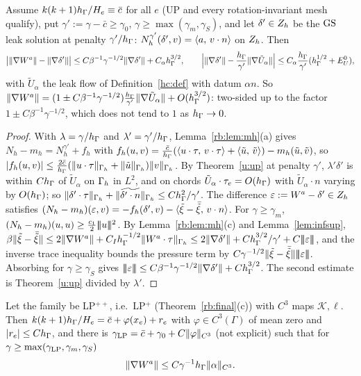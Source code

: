 \begin{theorem}\label{rb:Seq}
Assume $k(k+1)h_\Gamma/H_e\equiv\bar c$ for all $e$ (\textsf{UP} and every rotation-invariant mesh qualify), put $\gamma':=\gamma-\bar c\ge\gamma_0$, $\gamma\ge\max(\gamma_m,\gamma_S)$, and let $\delta'\in Z_h$ be the $\mathrm{GS}$ leak solution at penalty $\gamma'/h_\Gamma$: $N_h^{\gamma'}(\delta',v)=\langle a,\, v\cdot n\rangle$ on $Z_h$. Then
\[
\bigl|\lVert \nabla W^a\rVert-\lVert \nabla\delta'\rVert\bigr|\le C\beta^{-1}\gamma^{-1/2}\lVert \nabla\delta'\rVert+C_\alpha h_\Gamma^{3/2},\qquad
\Bigl|\lVert \nabla\delta'\rVert-\frac{h_\Gamma}{\gamma'}\lVert \nabla\tilde U_\alpha\rVert\Bigr|\le C_\alpha\frac{h_\Gamma}{\gamma'}(h_\Gamma^{1/2}+E^0_U),
\]
with $\tilde U_\alpha$ the leak flow of Definition~\ref{hc:def} with datum $\alpha n$. So $\lVert \nabla W^a\rVert=(1\pm C\beta^{-1}\gamma^{-1/2})\frac{h_\Gamma}{\gamma'}\lVert \nabla\tilde U_\alpha\rVert+O(h_\Gamma^{3/2})$: two-sided up to the factor $1\pm C\beta^{-1}\gamma^{-1/2}$, which does not tend to $1$ as $h_\Gamma\to0$.
\end{theorem}

\begin{proof}
With $\lambda=\gamma/h_\Gamma$ and $\lambda'=\gamma'/h_\Gamma$, Lemma~\ref{rb:lem:mh}(a) gives $N_h-m_h=N_h^{\gamma'}+f_h$ with $f_h(u,v)=\frac{\bar c}{h_\Gamma}(\langle u\cdot\tau,\, v\cdot\tau\rangle+\langle \tilde u,\, \tilde v\rangle)-m_h(\tilde u,\tilde v)$, so $|f_h(u,v)|\le\frac{2\bar c}{h_\Gamma}(\lVert u\cdot\tau\rVert_{\Gamma_h}+\lVert \tilde u\rVert_{\Gamma_h})\lVert v\rVert_{\Gamma_h}$. By Theorem~\ref{u:up} at penalty $\gamma'$, $\lambda'\delta'$ is within $Ch_\Gamma$ of $\tilde U_\alpha$ on $\Gamma_h$ in $L^2$, and on chords $\tilde U_\alpha\cdot\tau_e=O(h_\Gamma)$ with $\tilde U_\alpha\cdot n$ varying by $O(h_\Gamma)$; so $\lVert \delta'\cdot\tau\rVert_{\Gamma_h}+\lVert \widetilde{\delta'\cdot n}\rVert_{\Gamma_h}\le Ch_\Gamma^2/\gamma'$. The difference $\varepsilon:=W^a-\delta'\in Z_h$ satisfies $(N_h-m_h)(\varepsilon,v)=-f_h(\delta',v)-\langle \tilde\xi-\bar{\tilde\xi},\, v\cdot n\rangle$. For $\gamma\ge\gamma_m$, $(N_h-m_h)(u,u)\ge\frac{c_1}2|\!|\!|u|\!|\!|^2$. By Lemma~\ref{rb:lem:mh}(c) and Lemma~\ref{lem:infsup}, $\beta\lVert \tilde\xi-\bar{\tilde\xi}\rVert\le2\lVert \nabla W^a\rVert+C_Ih_\Gamma^{-1/2}\lVert W^a\cdot\tau\rVert_{\Gamma_h}\le2\lVert \nabla\delta'\rVert+Ch_\Gamma^{3/2}/\gamma'+C|\!|\!|\varepsilon|\!|\!|$, and the inverse trace inequality bounds the pressure term by $C\gamma^{-1/2}\lVert \tilde\xi-\bar{\tilde\xi}\rVert|\!|\!|\varepsilon|\!|\!|$. Absorbing for $\gamma\ge\gamma_S$ gives $|\!|\!|\varepsilon|\!|\!|\le C\beta^{-1}\gamma^{-1/2}\lVert \nabla\delta'\rVert+Ch_\Gamma^{3/2}$. The second estimate is Theorem~\ref{u:up} divided by $\lambda'$.
\end{proof}

\begin{theorem}[(S$_{\rm LP}$)]\label{rb:SLP}
Let the family be LP$^{++}$, i.e.\ LP$^+$ (Theorem~\ref{rb:final}(c)) with $C^3$ maps $\mathcal K,\ell$. Then $k(k+1)h_\Gamma/H_e=\bar c+\varphi(x_e)+r_e$ with $\varphi\in C^3(\Gamma)$ of mean zero and $|r_e|\le Ch_\Gamma$, and there is $\gamma_{\rm LP}=\bar c+\gamma_0+C\lVert \varphi\rVert_{C^3}$ (not explicit) such that for $\gamma\ge\max(\gamma_{\rm LP},\gamma_m,\gamma_S)$
\[
\lVert \nabla W^a\rVert\le C\gamma^{-1}h_\Gamma\lVert \alpha\rVert_{C^3}.
\]
\end{theorem}

